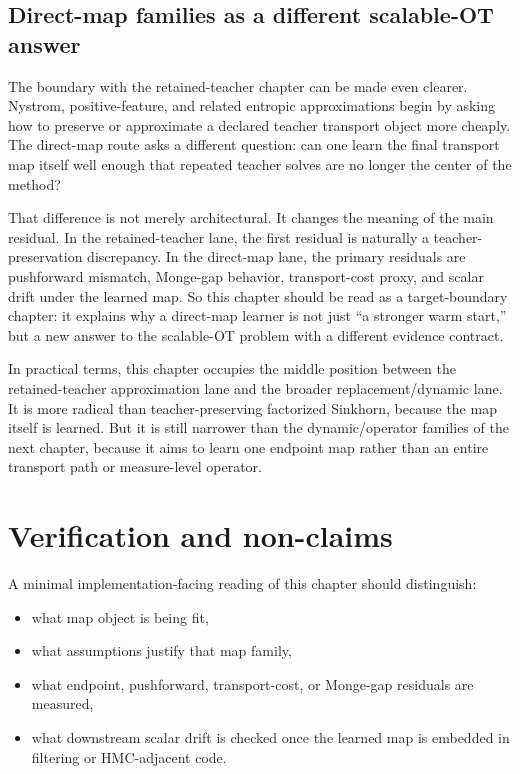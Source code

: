 \subsection{Direct-map families as a different scalable-OT answer}
\label{sec:bf-neural-ot-direct-scalable-boundary}

The boundary with the retained-teacher chapter can be made even clearer.  Nystrom, positive-feature, and related entropic approximations begin by
asking how to preserve or approximate a declared teacher transport object more
cheaply.  The direct-map route asks a different question: can one learn the final
transport map itself well enough that repeated teacher solves are no longer the
center of the method?

That difference is not merely architectural.  It changes the meaning of the main
residual.  In the retained-teacher lane, the first residual is naturally a
teacher-preservation discrepancy.  In the direct-map lane, the primary residuals
are pushforward mismatch, Monge-gap behavior, transport-cost proxy, and scalar
drift under the learned map.  So this chapter should be read as a target-boundary
chapter: it explains why a direct-map learner is not just ``a stronger warm
start,'' but a new answer to the scalable-OT problem with a different evidence
contract.

In practical terms, this chapter occupies the middle position between the
retained-teacher approximation lane and the broader replacement/dynamic lane.  It
is more radical than teacher-preserving factorized Sinkhorn, because the map
itself is learned.  But it is still narrower than the dynamic/operator families of
the next chapter, because it aims to learn one endpoint map rather than an entire
transport path or measure-level operator.

\section{Verification and non-claims}
\label{sec:bf-neural-ot-direct-verification}

A minimal implementation-facing reading of this chapter should distinguish:
\begin{itemize}
  \item what map object is being fit,
  \item what assumptions justify that map family,
  \item what endpoint, pushforward, transport-cost, or Monge-gap residuals are
  measured,
  \item what downstream scalar drift is checked once the learned map is embedded
  in filtering or HMC-adjacent code.
\end{itemize}

